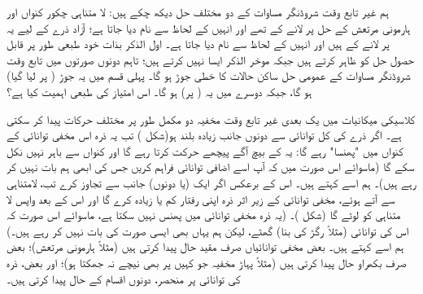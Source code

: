  ہم  غیر تابع وقت شروڈنگر مساوات کے دو مختلف حل دیکھ چکے ہیں:  لا متناہی چکور کنواں اور ہارمونی مرتعش کے حل  پر لانے کے  تھے اور انہیں   کے لحاظ سے نام دیا جاتا ہے؛  آزاد ذرے کے لیے یہ  پر لانے کے  ہیں اور انہیں   کے لحاظ  سے نام دیا جاتا ہے۔ اول الذکر بذات خود طبعی طور پر قابل حصول حل کو ظاہر کرتے ہیں جبکہ موخر الذکر  ایسا نہیں کرتے ہیں؛ تاہم دونوں صورتوں میں تابع وقت شروڈنگر  مساوات کے عمومی حل ساکن حالات کا خطی جوڑ ہو گا۔ پہلی قسم میں یہ جوڑ  ( پر لیا گیا)  ہو گا، جبکہ دوسرے میں یہ ( پر)  ہو گا۔ اس امتیاز کی طبعی اہمیت کیا ہے؟

 کلاسیکی میکانیات میں یک بعدی غیر تابع وقت مخفیہ دو مکمل طور پر مختلف حرکات پیدا کر سکتی ہے۔ اگر   ذرے کی کل توانائی  سے دونوں  جانب زیادہ بلند ہو(شکل  ) تب یہ ذرہ اس مخفی توانائی کے کنواں میں "پھنسا" رہے گا: یہ  کے بیچ آگے پیچھے حرکت کرتا رہے گا اور کنواں سے باہر نہیں نکل سکے گا (ماسوائے اس صورت میں کہ آپ اسے اضافی توانائی فراہم کریں جس کی ابھی ہم بات نہیں کر رہے ہیں)۔ ہم اسے  کہتے ہیں۔ اس کے برعکس اگر   ایک (یا دونوں) جانب     سے  تجاوز کرے تب،  لامتناہی سے آتے ہوئے، مخفی توانائی کے زیر اثر ذرہ اپنی رفتار کم یا زیادہ  کرے گا اور اس کے بعد واپس لا متناہی کو لوٹے گا   (شکل  )۔ (یہ ذرہ مخفی توانائی میں پھنس نہیں سکتا ہے، ماسوائے اس صورت  کہ اس کی توانائی (مثلاً رگڑ کی بنا) گھٹے، لیکن ہم یہاں بھی ایسی صورت کی بات نہیں کر رہے ہیں۔) ہم اسے  کہتے ہیں۔ بعض مخفی توانائیاں صرف مقید حال پیدا کرتی ہیں (مثلاً ہارمونی  مرتعش)؛  بعض صرف بکھراو حال پیدا کرتی  ہیں (مثلاً  پہاڑ مخفیہ  جو کہیں پر بھی نیچے نہ جھکتا ہو)؛ اور بعض، ذرہ کی توانائی پر منحصر، دونوں اقسام کے حال پیدا کرتی ہیں۔

